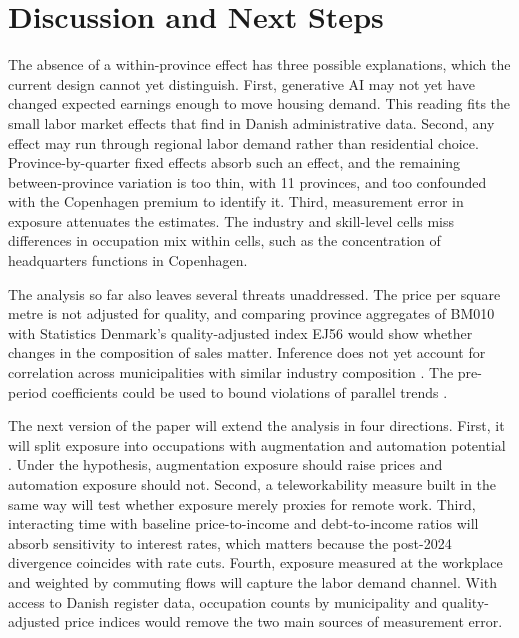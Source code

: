 \documentclass[12pt]{article}
\begin{document}
\section{Discussion and Next Steps}\label{sec:discussion}

The absence of a within-province effect has three possible explanations, which the current design cannot yet distinguish. First, generative AI may not yet have changed expected earnings enough to move housing demand. This reading fits the small labor market effects that \citet{humlum2025} find in Danish administrative data. Second, any effect may run through regional labor demand rather than residential choice. Province-by-quarter fixed effects absorb such an effect, and the remaining between-province variation is too thin, with 11 provinces, and too confounded with the Copenhagen premium to identify it. Third, measurement error in exposure attenuates the estimates. The industry and skill-level cells miss differences in occupation mix within cells, such as the concentration of headquarters functions in Copenhagen.

The analysis so far also leaves several threats unaddressed. The price per square metre is not adjusted for quality, and comparing province aggregates of BM010 with Statistics Denmark's quality-adjusted index EJ56 would show whether changes in the composition of sales matter. Inference does not yet account for correlation across municipalities with similar industry composition \citep{adao2019}. The pre-period coefficients could be used to bound violations of parallel trends \citep{rambachan2023}.

The next version of the paper will extend the analysis in four directions. First, it will split exposure into occupations with augmentation and automation potential \citep{gmyrek2023, pizzinelli2023}. Under the hypothesis, augmentation exposure should raise prices and automation exposure should not. Second, a teleworkability measure built in the same way \citep{dingel2020} will test whether exposure merely proxies for remote work. Third, interacting time with baseline price-to-income and debt-to-income ratios will absorb sensitivity to interest rates, which matters because the post-2024 divergence coincides with rate cuts. Fourth, exposure measured at the workplace and weighted by commuting flows will capture the labor demand channel. With access to Danish register data, occupation counts by municipality and quality-adjusted price indices would remove the two main sources of measurement error.
\end{document}
